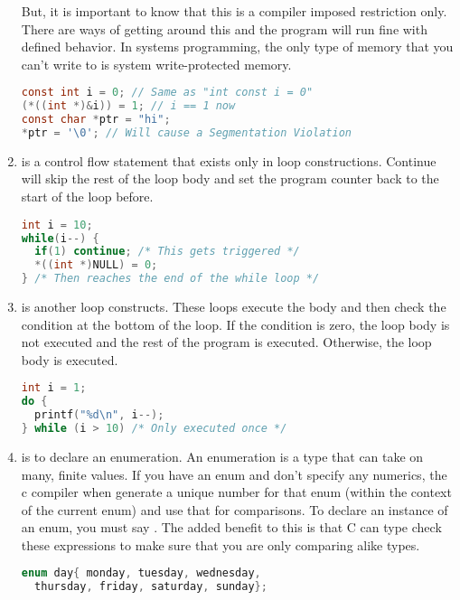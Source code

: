\begin{enumerate}
	      But, it is important to know that this is a compiler imposed restriction only. There are ways of getting around this and the program will run fine with defined behavior. In systems programming, the only type of memory that you can't write to is system write-protected memory.

	      \begin{lstlisting}[language=C]
const int i = 0; // Same as "int const i = 0"
(*((int *)&i)) = 1; // i == 1 now
const char *ptr = "hi";
*ptr = '\0'; // Will cause a Segmentation Violation
\end{lstlisting}

	\item {} is a control flow statement that exists only in loop constructions. Continue will skip the rest of the loop body and set the program counter back to the start of the loop before.

	      \begin{lstlisting}[language=C]
int i = 10;
while(i--) {
  if(1) continue; /* This gets triggered */
  *((int *)NULL) = 0;
} /* Then reaches the end of the while loop */
\end{lstlisting}

	\item {} is another loop constructs. These loops execute the body and then check the condition at the bottom of the loop. If the condition is zero, the loop body is not executed and the rest of the program is executed. Otherwise, the loop body is executed.

	      \begin{lstlisting}[language=C]
int i = 1;
do {
  printf("%d\n", i--);
} while (i > 10) /* Only executed once */
\end{lstlisting}

	\item {} is to declare an enumeration. An enumeration is a type that can take on many, finite values. If you have an enum and don't specify any numerics, the c compiler when generate a unique number for that enum (within the context of the current enum) and use that for comparisons. To declare an instance of an enum, you must say . The added benefit to this is that C can type check these expressions to make sure that you are only comparing alike types.

	      \begin{lstlisting}[language=C]
enum day{ monday, tuesday, wednesday,
  thursday, friday, saturday, sunday};


\end{lstlisting}
\end{enumerate}
